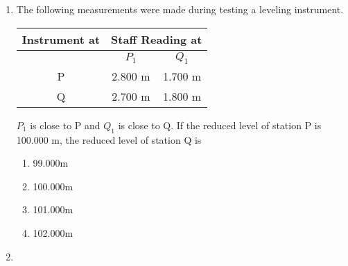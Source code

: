 \documentclass[journal]{IEEEtran}
\begin{document}
\begin{enumerate}
{        	\hfill
        	
        	\begin{multicols}{4}
        		\begin{enumerate}
        			\item $2.0m$ and $450$
        			\item $2.82m$ and $3150$
        			\item $2.0m$ and $3150$
        			\item $3.42m$ and $450$
        		\end{enumerate}
        	\end{multicols}
        	
        }
            \item{
        	
        	The following measurements were made during testing a leveling instrument.
        	
        	\begin{center}
        		\begin{tabular}{|c|c|c|}
        			\hline
        			\textbf{Instrument at} & \multicolumn{2}{c|}{\textbf{Staff Reading at}} \\ \hline
        			& \(P_1\) & \(Q_1\) \\ \hline
        			P & 2.800 m & 1.700 m \\ \hline
        			Q & 2.700 m & 1.800 m \\ \hline
        		\end{tabular}
        	\end{center}
        	
        	\(P_1\) is close to P and \(Q_1\) is close to Q. If the reduced level of station P is 100.000 m, the reduced level of station Q is
        	
        	\hfill
        	
        	\begin{multicols}{4}
        		\begin{enumerate}
        			\item 99.000m
        			\item 100.000m
        			\item 101.000m
        			\item 102.000m
        		\end{enumerate}
        	\end{multicols}
        	
        }    
        \item{
        
}
\end{enumerate}
\end{document}
